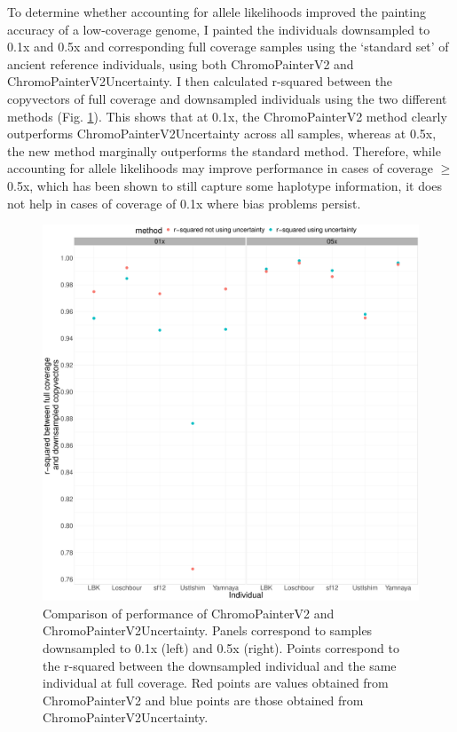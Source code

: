 To determine whether accounting for allele likelihoods improved the painting accuracy of a low-coverage genome, I painted the individuals downsampled to 0.1x and 0.5x and corresponding full coverage samples using the `standard set' of ancient reference individuals, using both ChromoPainterV2 and ChromoPainterV2Uncertainty. I then calculated r-squared between the copyvectors of full coverage and downsampled individuals using the two different methods (Fig. \ref{fig:uncertainty_v_noUncertainty_0.5x_0.1x}). This shows that at 0.1x, the ChromoPainterV2 method clearly outperforms ChromoPainterV2Uncertainty across all samples, whereas at 0.5x, the new method marginally outperforms the standard method. Therefore, while accounting for allele likelihoods may improve performance in cases of coverage $\geq$0.5x, which has been shown to still capture some haplotype information, it does not help in cases of coverage of 0.1x where bias problems persist.


\begin{figure}[htp]
    \centering
    \includegraphics[width=1.0\textwidth]{../images/chapter1/uncertainty_v_noUncertainty_0.5x_0.1x.pdf}
    \caption{Comparison of performance of ChromoPainterV2 and ChromoPainterV2Uncertainty. Panels correspond to samples downsampled to 0.1x (left) and 0.5x (right). Points correspond to the r-squared between the downsampled individual and the same individual at full coverage. Red points are values obtained from ChromoPainterV2 and blue points are those obtained from ChromoPainterV2Uncertainty.}
    \label{fig:uncertainty_v_noUncertainty_0.5x_0.1x}
\end{figure}


